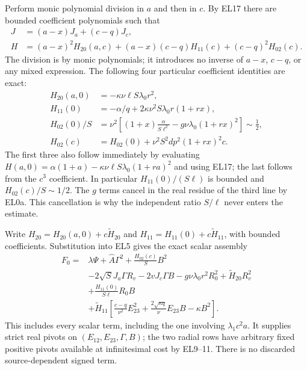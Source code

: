 Perform monic polynomial division in $a$ and then in $c$.
By EL17 there are bounded coefficient polynomials such that
\[
\begin{aligned}
 J&=(a-x)J_a+(c-q)J_c,\\
 H&=(a-x)^2H_{20}(a,c)
       +(a-x)(c-q)H_{11}(c)+(c-q)^2H_{02}(c).
\end{aligned}                                                     \tag{EL19}
\]
The division is by monic polynomials; it introduces no inverse of
$a-x$, $c-q$, or any mixed expression.  The following four particular
coefficient identities are exact:
\[
\begin{aligned}
 H_{20}(a,0)&=-\kappa\nu\ell S\lambda_0r^2,\\
 H_{11}(0)&=-\alpha/q+2\kappa\nu^2S\lambda_0r(1+rx),\\
 H_{02}(0)/S
   &=\nu^2\left[(1+x)\frac\alpha{S\ell^2}
                 -g\nu\lambda_0(1+rx)^2\right]\sim\tfrac12,\\
 H_{02}(c)&=H_{02}(0)+\nu^2S^2dp^2(1+rx)^2c.
\end{aligned}                                                     \tag{EL20}
\]
The first three also follow immediately by evaluating
$H(a,0)=\alpha(1+a)-\kappa\nu\ell S\lambda_0(1+ra)^2$
and using EL17; the last follows from the $c^3$ coefficient.
In particular $H_{11}(0)/(S\ell)$ is bounded and
$H_{02}(c)/S\sim1/2$.  The $g$ terms cancel in the real residue
of the third line by EL0a.  This cancellation is why the independent
ratio $S/\ell$ never enters the estimate.

Write $H_{20}=H_{20}(a,0)+c\widetilde H_{20}$ and
$H_{11}=H_{11}(0)+c\widetilde H_{11}$, with bounded coefficients.
Substitution into EL5 gives the exact scalar assembly
\[
\begin{aligned}
 F_0={}&\lambda\Psi+\widehat A\Gamma^2
                 +\frac{H_{02}(c)}S B^2\\
 &-2\sqrt S J_a\Gamma R_v-2vJ_c\Gamma B
       -g\nu\lambda_0r^2R_0^2+\widetilde H_{20}R_v^2\\
 &+\frac{H_{11}(0)}{S\ell}R_0B\\
 &+\widetilde H_{11}
       \left[\frac{c-q}{\nu^2}E_{23}^2
             +\frac{2\sqrt{\kappa q}}\nu E_{23}B-\kappa B^2\right].
\end{aligned}                                                     \tag{EL21}
\]
This includes every scalar term, including the one involving
$\lambda_1c^2a$.  It supplies strict real pivots on
$(E_{12},E_{23},\Gamma,B)$; the two radial rows have arbitrary
fixed positive pivots available at infinitesimal cost by EL9--11.
There is no discarded source-dependent signed term.

